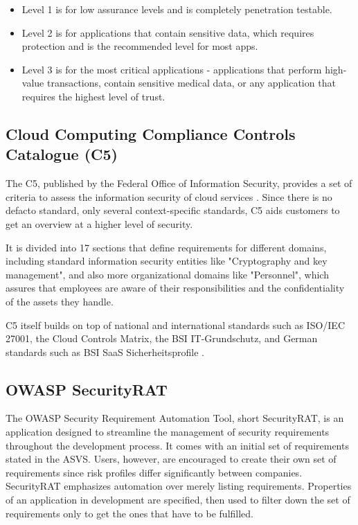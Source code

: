 \begin{itemize}
    \item Level 1 is for low assurance levels and is completely penetration testable. 
    
    \item Level 2 is for applications that contain sensitive data, which requires protection and is the recommended level for most apps.
    
    \item Level 3 is for the most critical applications - applications that perform high-value transactions, contain sensitive medical data, or any application that requires the highest level of trust.
\end{itemize}
\citep{asvs4.0}

\subsection{Cloud Computing Compliance Controls Catalogue (C5)}
The C5, published by the Federal Office of Information Security, provides a set of criteria to assess the information security of cloud services \citep{bsiC5}.
Since there is no defacto standard, only several context-specific standards, C5 aids customers to get an overview at a higher level of security. 

It is divided into 17 sections that define requirements for different domains, including standard information security entities like "Cryptography and key management", and also more organizational domains like "Personnel", which assures that employees are aware of their responsibilities and the confidentiality of the assets they handle. 

C5 itself builds on top of national and international standards such as ISO/IEC 27001, the Cloud Controls Matrix, the BSI IT-Grundschutz, and German standards such as BSI SaaS Sicherheitsprofile \citep{bsiC5}.

\subsection{OWASP SecurityRAT}
The OWASP Security Requirement Automation Tool, short SecurityRAT, is an application designed to streamline the management of security requirements throughout the development process.
It comes with an initial set of requirements stated in the ASVS. Users, however, are encouraged to create their own set of requirements since risk profiles differ significantly between companies.
SecurityRAT emphasizes automation over merely listing requirements. Properties of an application in development are specified, then used to filter down the set of requirements only to get the ones that have to be fulfilled. 

